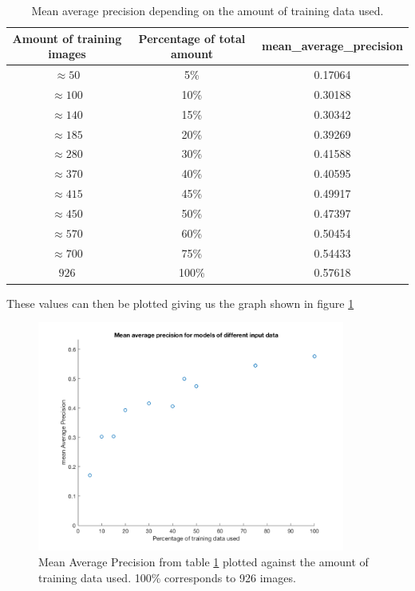 \begin{table}[h]
\centering
\begin{tabular}{ |c|c|c| } 
 \hline
 Amount of training images & Percentage of total amount & mean\_average\_precision  \\ 
 \hline
 $\approx 50$& 5\% & 0.17064 \\
 \hline
 $\approx 100$& 10\% & 0.30188 \\
\hline
  $\approx 140$& 15\% &  0.30342 \\
 \hline
 $\approx 185$& 20\% & 0.39269 \\
 \hline
$\approx 280$ &  30\% & 0.41588 \\
 \hline
 $\approx 370$& 40\% & 0.40595 \\
 \hline
 $\approx 415$& 45\% & 0.49917 \\
 \hline
 $\approx 450$& 50\% & 0.47397 \\
\hline
$\approx 570$ & 60\% & 0.50454 \\
\hline
 $\approx 700$& 75\% & 0.54433 \\
 \hline
$926$ & 100\% & 0.57618 \\
 \hline
\end{tabular}
\caption{Mean average precision depending on the amount of training data used.}
\label{table:mAP}
\end{table}

These values can then be plotted giving us the graph shown in figure \ref{fig:mAPResult}

\begin{figure}[h]
\begin{center}
\includegraphics[width = 0.9\textwidth]{./Images/mapPlot.png}
\caption{Mean Average Precision from table \ref{table:mAP} plotted against the amount of training data used. 100\% corresponds to 926 images.}
\label{fig:mAPResult}
\end{center}
\end{figure}

